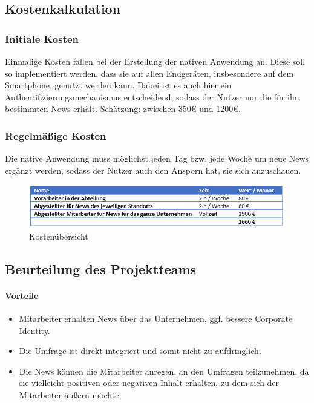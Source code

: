 \subsection{Kostenkalkulation}

\subsubsection{Initiale Kosten}

Einmalige Kosten fallen bei der Erstellung der nativen Anwendung an. Diese soll so implementiert werden, dass sie auf allen Endgeräten, insbesondere auf dem Smartphone, genutzt werden kann. Dabei ist es auch hier ein Authentifizierungsmechanismus entscheidend, sodass der Nutzer nur die für ihn bestimmten News erhält.
Schätzung: zwischen 350€ und 1200€.

\subsubsection{Regelmäßige Kosten}

Die native Anwendung muss möglichst jeden Tag bzw. jede Woche um neue News ergänzt werden, sodass der Nutzer auch den Ansporn hat, sie sich anzuschauen.

\begin{figure}[H] 
\centering 
\includegraphics[scale=0.82]{images/5kosten} 
\caption[Kostenübersicht]{Kostenübersicht\protect} 
\label{ws} 
\end{figure}

\subsection{Beurteilung des Projektteams}

\paragraph{Vorteile}

\begin{itemize}
\item	Mitarbeiter erhalten News über das Unternehmen, ggf. bessere Corporate Identity.
\item Die Umfrage ist direkt integriert und somit nicht zu aufdringlich.
\item Die News können die Mitarbeiter anregen, an den Umfragen teilzunehmen, da sie vielleicht positiven oder negativen Inhalt erhalten, zu dem sich der Mitarbeiter äußern möchte
\end{itemize}

